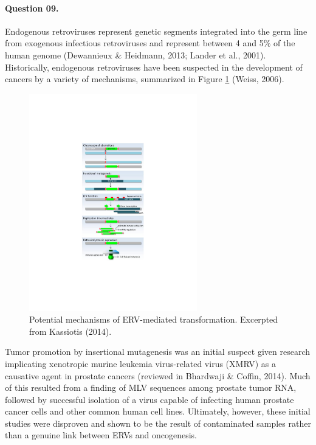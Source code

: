 \documentclass[11pt,letterpaper,final] {article}
\begin{document}
\paragraph{Question 09.} Endogenous retroviruses represent genetic segments integrated into the germ line from exogenous infectious retroviruses and represent between 4 and 5\% of the human genome (Dewannieux \& Heidmann, 2013; Lander et al., 2001). Historically, endogenous retroviruses have been suspected in the development of cancers by a variety of mechanisms, summarized in Figure \ref{fig:04} (Weiss, 2006).

\begin{figure}[htp]
  \centering
    \includegraphics[width=0.65\textwidth]{retrovirus}
	\caption{Potential mechanisms of ERV-mediated transformation. Excerpted from Kassiotis (2014).}
	\label{fig:04}
\end{figure}

Tumor promotion by insertional mutagenesis was an initial suspect given research implicating xenotropic murine leukemia virus-related virus (XMRV) as a causative agent in prostate cancers (reviewed in Bhardwaji \& Coffin, 2014). Much of this resulted from a finding of MLV sequences among prostate tumor RNA, followed by successful isolation of a virus capable of infecting human prostate cancer cells and other common human cell lines. Ultimately, however, these initial studies were disproven and shown to be the result of contaminated samples rather than a genuine link between ERVs and oncogenesis.
\end{document}

